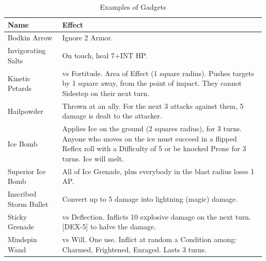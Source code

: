 \begin{table}[h!tbp]
	\begin{center}
		\begin{tabular}{p{4cm}p{13cm}} \toprule
			
		    \textbf{Name} & \textbf{Effect} \\ \midrule

		    Bodkin Arrow & Ignore 2 Armor. \\[2mm] 

            Invigorating Salts & On touch, heal 7+INT HP. \\[2mm] 

            Kinetic Petards & vs Fortitude. Area of Effect (1 square radius). Pushes targets by 1 square away, from the point of impact. They cannot Sidestep on their next turn. \\[2mm] 
          
            Hailpowder & Thrown at an ally. For the next 3 attacks against them, 5 damage is dealt to the attacker. \\[2mm] 
            
            Ice Bomb & Applies Ice on the ground (2 squares radius), for 3 turns. Anyone who moves on the ice must succeed in a flipped Reflex roll with a Difficulty of 5 or be knocked Prone for 3 turns. Ice will melt. \\[2mm] 
            Superior Ice Bomb &	All of Ice Grenade, plus everybody in the blast radius loses 1 AP. \\[2mm] 

            Inscribed Storm Bullet & Convert up to 5 damage into lightning (magic) damage. \\[2mm] 

            Sticky Grenade & vs Deflection. Inflicts 10 explosive damage on the next turn. [DEX-5] to halve the damage. \\[2mm] 

            Mindspin Wand & vs Will. One use. Inflict at random a Condition among: Charmed, Frightened, Enraged. Lasts 3 turns. \\[2mm] 

		    \bottomrule
		\end{tabular}
	\end{center}
	\caption{Examples of Gadgets}
  \label{gadgets_example_table}
\end{table}

